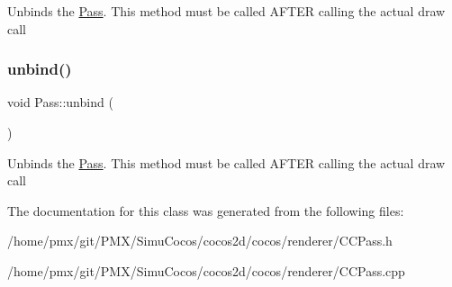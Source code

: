 Unbinds the \hyperlink{classPass}{Pass}. This method must be called A\+F\+T\+ER calling the actual draw call \mbox{\label{classPass_a50df7eb7f9ce52d7c93ca5073f675f32}} 
\subsubsection{\texorpdfstring{unbind()}{unbind()}\hspace{0.1cm}{\footnotesize\ttfamily [2/2]}}
{\footnotesize\ttfamily void Pass\+::unbind (\begin{DoxyParamCaption}{ }\end{DoxyParamCaption})}

Unbinds the \hyperlink{classPass}{Pass}. This method must be called A\+F\+T\+ER calling the actual draw call 

The documentation for this class was generated from the following files\+:\begin{DoxyCompactItemize}
\item 
/home/pmx/git/\+P\+M\+X/\+Simu\+Cocos/cocos2d/cocos/renderer/C\+C\+Pass.\+h\item 
/home/pmx/git/\+P\+M\+X/\+Simu\+Cocos/cocos2d/cocos/renderer/C\+C\+Pass.\+cpp\end{DoxyCompactItemize}
